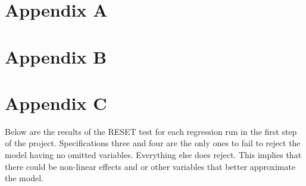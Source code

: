 \documentclass[11pt]{article}
\begin{document}
\newpage 

\section*{Appendix A}



\newpage

\section*{Appendix B}



\newpage

\section*{Appendix C}

Below are the results of the RESET test for each regression run in the first step of the project. Specifications three and four are the only ones to fail to reject the model having no omitted variables. Everything else does reject. This implies that there could be non-linear effects and or other variables that better approximate the model.
\end{document}
